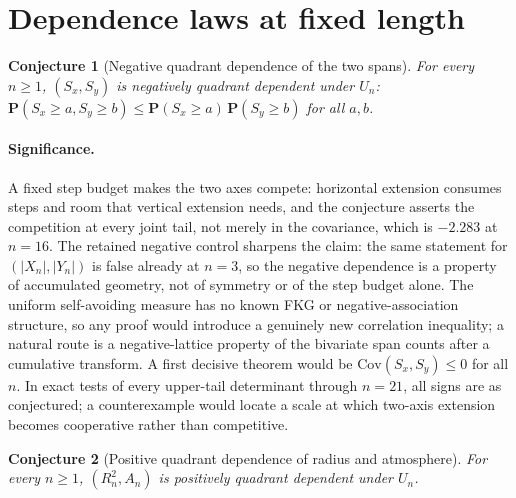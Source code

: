 \documentclass[11pt]{article}
\newtheorem{conjecture}{Conjecture}
\theoremstyle{definition}
\begin{document}
\section{Dependence laws at fixed length}

\begin{conjecture}[Negative quadrant dependence of the two spans]\label{af9}
For every $n\ge1$, $(S_x,S_y)$ is negatively quadrant dependent under $U_n$: $\mathbf P(S_x\ge a,S_y\ge b)\le\mathbf P(S_x\ge a)\,\mathbf P(S_y\ge b)$ for all $a,b$.
\end{conjecture}

\paragraph{Significance.}
A fixed step budget makes the two axes compete: horizontal extension consumes steps and room that vertical extension needs, and the conjecture asserts the competition at every joint tail, not merely in the covariance, which is $-2.283$ at $n=16$.  The retained negative control sharpens the claim: the same statement for $(|X_n|,|Y_n|)$ is false already at $n=3$, so the negative dependence is a property of accumulated geometry, not of symmetry or of the step budget alone.  The uniform self-avoiding measure has no known FKG or negative-association structure, so any proof would introduce a genuinely new correlation inequality; a natural route is a negative-lattice property of the bivariate span counts after a cumulative transform.  A first decisive theorem would be $\mathrm{Cov}(S_x,S_y)\le0$ for all $n$.  In exact tests of every upper-tail determinant through $n=21$, all signs are as conjectured; a counterexample would locate a scale at which two-axis extension becomes cooperative rather than competitive.

\begin{conjecture}[Positive quadrant dependence of radius and atmosphere]\label{af10}
For every $n\ge1$, $(R_n^2,A_n)$ is positively quadrant dependent under $U_n$.
\end{conjecture}
\end{document}
